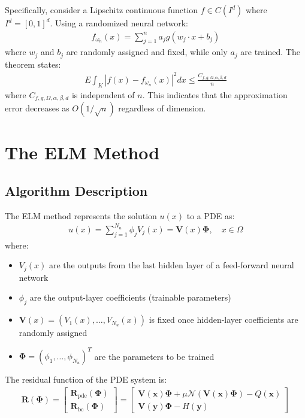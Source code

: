 \documentclass[11pt]{article}
\begin{document}
Specifically, consider a Lipschitz continuous function $f \in C(I^d)$ where $I^d = [0,1]^d$. Using a randomized neural network:
\begin{align}
    f_{\omega_n}(x) = \sum_{j=1}^n a_j g(w_j \cdot x + b_j)
\end{align}
where $w_j$ and $b_j$ are randomly assigned and fixed, while only $a_j$ are trained. The theorem states:
\begin{align}
    E\int_K |f(x) - f_{\omega_n}(x)|^2 dx \leq \frac{C_{f,g,\Omega,\alpha,\beta,d}}{n}
\end{align}
where $C_{f,g,\Omega,\alpha,\beta,d}$ is independent of $n$. This indicates that the approximation error decreases as $O(1/\sqrt{n})$ regardless of dimension.

\section{The ELM Method}

\subsection{Algorithm Description}

The ELM method represents the solution $u(x)$ to a PDE as:
\begin{align}
    u(x) = \sum_{j=1}^{N_u} \phi_j V_j(x) = \mathbf{V}(x)\mathbf{\Phi}, \quad x \in \Omega
\end{align}
where:
\begin{itemize}
    \item $V_j(x)$ are the outputs from the last hidden layer of a feed-forward neural network
    \item $\phi_j$ are the output-layer coefficients (trainable parameters)
    \item $\mathbf{V}(x) = (V_1(x),\ldots,V_{N_u}(x))$ is fixed once hidden-layer coefficients are randomly assigned
    \item $\mathbf{\Phi} = (\phi_1,\ldots,\phi_{N_u})^T$ are the parameters to be trained
\end{itemize}

The residual function of the PDE system is:
\begin{align}
    \mathbf{R}(\mathbf{\Phi}) = \begin{bmatrix} \mathbf{R}_\text{pde}(\mathbf{\Phi}) \\ \mathbf{R}_\text{bc}(\mathbf{\Phi}) \end{bmatrix} = \begin{bmatrix} \mathbf{V}(\mathbf{x})\mathbf{\Phi} + \mu\mathcal{N}(\mathbf{V}(\mathbf{x})\mathbf{\Phi}) - Q(\mathbf{x}) \\ \mathbf{V}(\mathbf{y})\mathbf{\Phi} - H(\mathbf{y}) \end{bmatrix}
\end{align}
\end{document}
